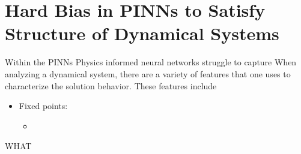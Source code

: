 \documentclass[11pt]{article}
\begin{document}
\section*{Hard Bias in PINNs to Satisfy Structure of Dynamical Systems}
Within the PINNs 
Physics informed neural networks struggle to capture When analyzing a dynamical system, there are a variety of features that one uses to characterize the solution behavior. These features include
\begin{itemize}
	\item Fixed points: \begin{itemize}
	\item 
	\end{itemize}
\end{itemize}
WHAT
\pagebreak
\end{document}
